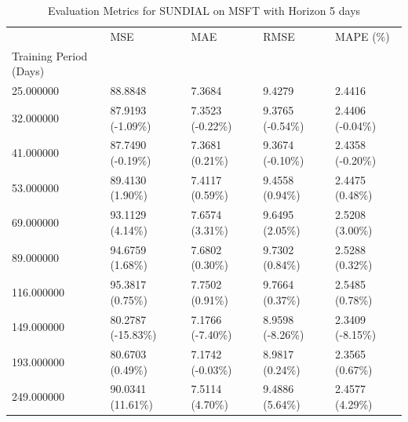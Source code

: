 \begin{table}
\caption{Evaluation Metrics for SUNDIAL on MSFT with Horizon 5 days}
\label{tab:sundial_MSFT_h5_metrics}
\begin{tabular}{lllll}
\toprule
 & MSE & MAE & RMSE & MAPE (\%) \\
Training Period (Days) &  &  &  &  \\
\midrule
25.000000 & 88.8848 & 7.3684 & 9.4279 & 2.4416 \\
32.000000 & 87.9193 (-1.09\%) & 7.3523 (-0.22\%) & 9.3765 (-0.54\%) & 2.4406 (-0.04\%) \\
41.000000 & 87.7490 (-0.19\%) & 7.3681 (0.21\%) & 9.3674 (-0.10\%) & 2.4358 (-0.20\%) \\
53.000000 & 89.4130 (1.90\%) & 7.4117 (0.59\%) & 9.4558 (0.94\%) & 2.4475 (0.48\%) \\
69.000000 & 93.1129 (4.14\%) & 7.6574 (3.31\%) & 9.6495 (2.05\%) & 2.5208 (3.00\%) \\
89.000000 & 94.6759 (1.68\%) & 7.6802 (0.30\%) & 9.7302 (0.84\%) & 2.5288 (0.32\%) \\
116.000000 & 95.3817 (0.75\%) & 7.7502 (0.91\%) & 9.7664 (0.37\%) & 2.5485 (0.78\%) \\
149.000000 & 80.2787 (-15.83\%) & 7.1766 (-7.40\%) & 8.9598 (-8.26\%) & 2.3409 (-8.15\%) \\
193.000000 & 80.6703 (0.49\%) & 7.1742 (-0.03\%) & 8.9817 (0.24\%) & 2.3565 (0.67\%) \\
249.000000 & 90.0341 (11.61\%) & 7.5114 (4.70\%) & 9.4886 (5.64\%) & 2.4577 (4.29\%) \\
\bottomrule
\end{tabular}
\end{table}
